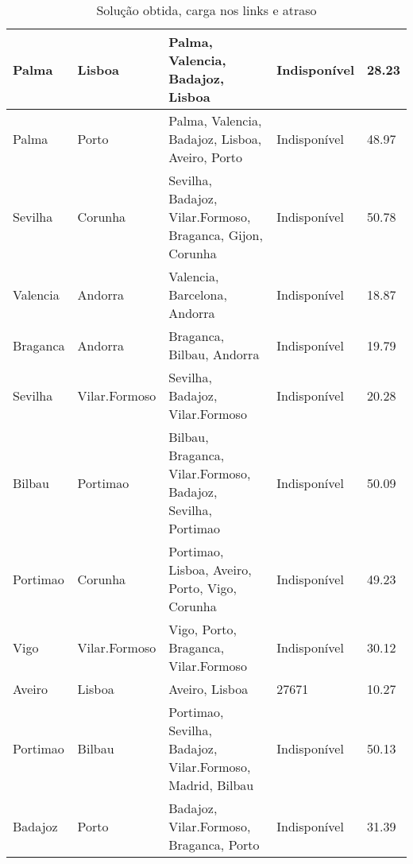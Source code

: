 \begin{table}[!htb]
{\begin{tabular}{|l|l|l|l|l|}
Palma & Lisboa & Palma, Valencia, Badajoz, Lisboa & Indisponível & 28.23 \\ \hline
Palma & Porto & Palma, Valencia, Badajoz, Lisboa, Aveiro, Porto & Indisponível & 48.97 \\ \hline
Sevilha & Corunha & Sevilha, Badajoz, Vilar.Formoso, Braganca, Gijon, Corunha & Indisponível & 50.78 \\ \hline
Valencia & Andorra & Valencia, Barcelona, Andorra & Indisponível & 18.87 \\ \hline
Braganca & Andorra & Braganca, Bilbau, Andorra & Indisponível & 19.79 \\ \hline
Sevilha & Vilar.Formoso & Sevilha, Badajoz, Vilar.Formoso & Indisponível & 20.28 \\ \hline
Bilbau & Portimao & Bilbau, Braganca, Vilar.Formoso, Badajoz, Sevilha, Portimao & Indisponível & 50.09 \\ \hline
Portimao & Corunha & Portimao, Lisboa, Aveiro, Porto, Vigo, Corunha & Indisponível & 49.23 \\ \hline
Vigo & Vilar.Formoso & Vigo, Porto, Braganca, Vilar.Formoso & Indisponível & 30.12 \\ \hline
Aveiro & Lisboa & Aveiro, Lisboa & 27671 & 10.27 \\ \hline
Portimao & Bilbau & Portimao, Sevilha, Badajoz, Vilar.Formoso, Madrid, Bilbau & Indisponível & 50.13 \\ \hline
Badajoz & Porto & Badajoz, Vilar.Formoso, Braganca, Porto & Indisponível & 31.39 \\ \hline
\end{tabular}}
\caption[]{Solução obtida, carga nos links e atraso}
\end{table}

